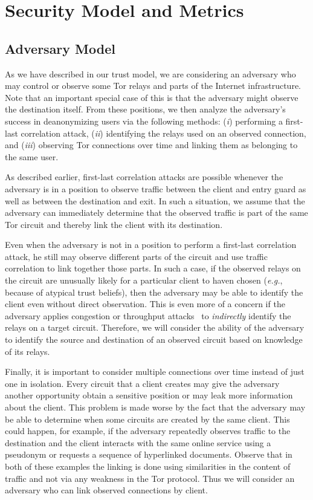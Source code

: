 \documentclass[conference]{styles/IEEEtran}
\newcommand{\eg}{\emph{e.g.}}
\begin{document}
\section{Security Model and Metrics}\label{sec:metrics}




\subsection{Adversary Model}
As we have described in our trust model, we are considering an adversary who may
control or observe some Tor relays and parts of the Internet infrastructure. Note that
an important special case of this is that the adversary might observe the destination itself. From
these positions, we then analyze the adversary's success in deanonymizing users via the following
methods: (\emph{i}) performing a first-last correlation attack, (\emph{ii})
identifying the relays used on an observed connection, and (\emph{iii}) observing Tor
connections over time and linking them as belonging to the same user.

As described earlier, first-last correlation attacks are possible whenever the adversary
is in a position to observe traffic between the client and entry guard as well as between
the destination and exit. In such a situation, we assume that the adversary can immediately
determine that the observed traffic is part of the same Tor circuit and thereby
link the client with its destination.

Even when the adversary is not in a position to perform a first-last correlation attack, he still
may observe different parts of the circuit and use traffic correlation to link together those
parts. In such a case, if the observed relays on the circuit are unusually likely for
a particular client to haven chosen (\eg{}, because of atypical trust beliefs), then the adversary
may be able to identify the client even without direct observation. This is even more of a concern
if the adversary applies congestion or throughput attacks~\cite{long-paths,mittal-stealthy} to
\emph{indirectly} identify the relays on a target circuit. Therefore, we will consider the ability
of the adversary to identify the source and destination of an observed circuit based on knowledge
of its relays.

Finally, it is important to consider multiple connections over time instead of just one in
isolation. Every circuit that a client creates may give the adversary another opportunity obtain a
sensitive position or may leak more information about the client. This problem is made worse by
the fact that the adversary may be able to determine when some circuits are created by the same
client. This could happen, for example, if the adversary repeatedly observes traffic to the
destination and the client interacts with the same online service using
a pseudonym or requests a sequence of hyperlinked documents. Observe that in both of
these examples the linking is done using similarities in the content of traffic and not via any
weakness in the Tor protocol. Thus we will consider an adversary who can link
observed connections by client.
\end{document}
